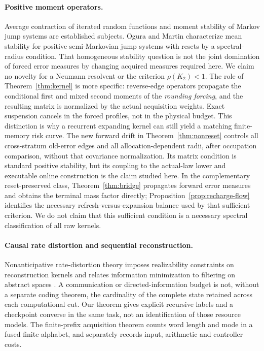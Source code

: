 \paragraph{Positive moment operators.}
Average contraction of iterated random functions \cite{diaconis} and moment stability of Markov jump systems \cite{costa} are established subjects. Ogura and Martin \cite{ogura} characterize mean stability for positive semi-Markovian jump systems with resets by a spectral-radius condition. That homogeneous stability question is not the joint domination of forced error measures by changing acquired measures required here. We claim no novelty for a Neumann resolvent or the criterion $\rho(K_2)<1$. The role of Theorem~\ref{thm:kernel} is more specific: reverse-edge operators propagate the conditional first and mixed second moments of the \emph{rounding forcing}, and the resulting matrix is normalized by the actual acquisition weights. Exact suspension cancels in the forced profiles, not in the physical budget. This distinction is why a recurrent expanding kernel can still yield a matching finite-memory risk curve. The new forward drift in Theorem~\ref{thm:nonreset} controls all cross-stratum old-error edges and all allocation-dependent radii, after occupation comparison, without that covariance normalization. Its matrix condition is standard positive stability, but its coupling to the actual-law lower and executable online construction is the claim studied here. In the complementary reset-preserved class, Theorem~\ref{thm:bridge} propagates forward error measures and obtains the terminal mass factor directly; Proposition~\ref{prop:recharge-flow} identifies the necessary refresh-versus-expansion balance used by that sufficient criterion. We do not claim that this sufficient condition is a necessary spectral classification of all raw kernels.

\paragraph{Causal rate distortion and sequential reconstruction.}
Nonanticipative rate-distortion theory imposes realizability constraints on reconstruction kernels and relates information minimization to filtering on abstract spaces \cite{nonanticipative}. A communication or directed-information budget is not, without a separate coding theorem, the cardinality of the complete state retained across each computational cut. Our theorem gives explicit recursive labels and a checkpoint converse in the same task, not an identification of those resource models. The finite-prefix acquisition theorem counts word length and mode in a fused finite alphabet, and separately records input, arithmetic and controller costs.

